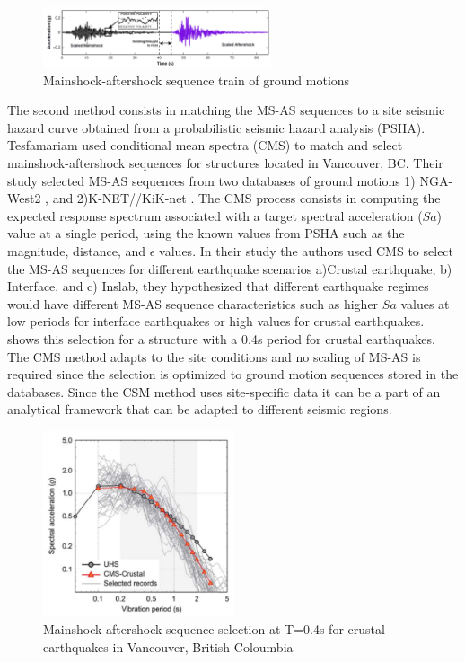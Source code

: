 \begin{figure}[htbp]
\centering
\includegraphics[width=0.6\textwidth]{Chapter-2/figs/MS-AS_sequence_Luco}
\caption{Mainshock-aftershock sequence train of ground motions \cite{Raghunandan2015}}
\label{fig:MS-AS_Luco}
\end{figure}

The second method consists in matching the MS-AS sequences to a site seismic hazard curve obtained from a probabilistic seismic hazard analysis (PSHA). Tesfamariam \cite{Tesfamariam2015} used conditional mean spectra (CMS) to match and select mainshock-aftershock sequences for structures located in Vancouver, BC. Their study selected MS-AS sequences from two databases of ground motions 1) NGA-West2 \citep{Ancheta2014}, and 2)K-NET//KiK-net \cite{NIEDK-NETKiK-net2019}. The CMS process consists in computing the expected response spectrum associated with a target spectral acceleration ($Sa$) value at a single period, using the known values from PSHA such as the magnitude, distance, and $\epsilon$ values. In their study the authors used CMS to select the MS-AS sequences for different earthquake scenarios a)Crustal earthquake, b) Interface, and c) Inslab, they hypothesized that different earthquake regimes would have different MS-AS sequence characteristics such as higher $Sa$ values at low periods for interface earthquakes or high values for crustal earthquakes.  shows this selection for a structure with a 0.4s period for crustal earthquakes. The CMS method adapts to the site conditions and no scaling of MS-AS is required since the selection is optimized to ground motion sequences stored in the databases. Since the CSM method uses site-specific data it can be a part of an analytical framework that can be adapted to different seismic regions.

\begin{figure}[htbp]
\centering
\includegraphics[width=0.5\textwidth]{Chapter-2/figs/CMS-Tesfamariam_MS-AS_seq}
\caption{Mainshock-aftershock sequence selection at T=0.4s for crustal earthquakes in Vancouver, British Coloumbia \cite{Tesfamariam2015}}
\label{fig:MS-AS_Goda}
\end{figure}


